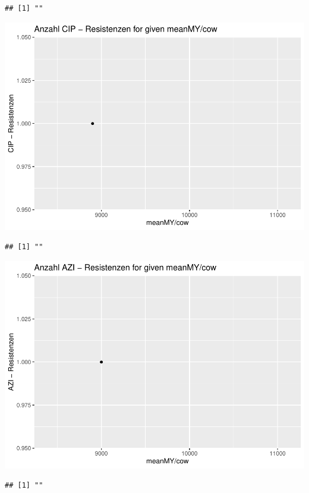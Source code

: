 \documentclass[
]{article}
\begin{document}
\begin{verbatim}
## [1] ""
\end{verbatim}

\includegraphics{NResistenzen_files/figure-latex/numerical_variables-2.pdf}

\begin{verbatim}
## [1] ""
\end{verbatim}

\includegraphics{NResistenzen_files/figure-latex/numerical_variables-3.pdf}

\begin{verbatim}
## [1] ""
\end{verbatim}
\end{document}
